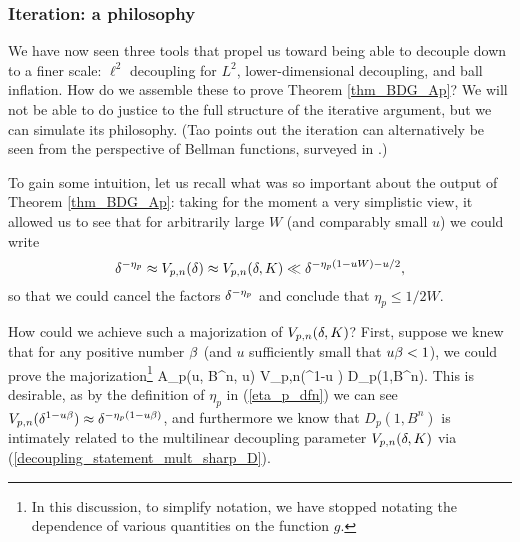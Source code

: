 \documentclass[brochure,english,12pt]{bourbaki}%
\begin{document}
\subsubsection{Iteration: a philosophy}
We have now seen three tools that propel us toward being able to decouple down to a finer scale: $\ell^2$ decoupling for $L^2$, lower-dimensional decoupling, and ball inflation.
How do we assemble these to prove Theorem \ref{thm_BDG_Ap}?  
We will not be able to do justice to the full structure of the iterative argument, but we can simulate its philosophy. (Tao \cite{Tao15ablog} points out the iteration can alternatively be seen from the perspective of Bellman functions, surveyed in \cite{NazTre96}.)


To gain some intuition, let us recall what was so important about the output of Theorem \ref{thm_BDG_Ap}: taking for the moment a very simplistic view, it allowed us  to see that for arbitrarily large $W$ (and comparably  small $u$) we could write
\[  \delta^{-\eta_p} \approx V_{p,n}(\delta)\approx V_{p,n}(\delta,K) \ll \delta^{-\eta_p(1-uW) -u/2 },\]
 so that we could cancel the factors $\delta^{-\eta_p}$ and conclude that $\eta_p \leq 1/2W$. 

How could we achieve such a majorization of $V_{p,n}(\delta,K)$? First, suppose we knew that for any positive number $\beta$ (and $u$ sufficiently small that $u\beta<1$), we could prove the majorization\footnote{In this discussion, to simplify notation, we have stopped notating the dependence of various quantities on the function $g$.}
\beq\label{Ap_Dp_relation}
 A_p(\be u, B^n, \be u) \ll V_{p,n}(\del^{1-u \be}) D_p(1,B^n).
 \eeq
 This is desirable, as by the definition of $\eta_p$ in (\ref{eta_p_dfn}) we can see $V_{p,n}(\delta^{1-u \beta}) \approx \delta^{-\eta_p(1-u\beta)}$, and furthermore we know that $D_p(1,B^n)$ is intimately related to the multilinear decoupling parameter $V_{p,n}(\delta,K)$  via (\ref{decoupling_statement_mult_sharp_D}).
 
\end{document}
